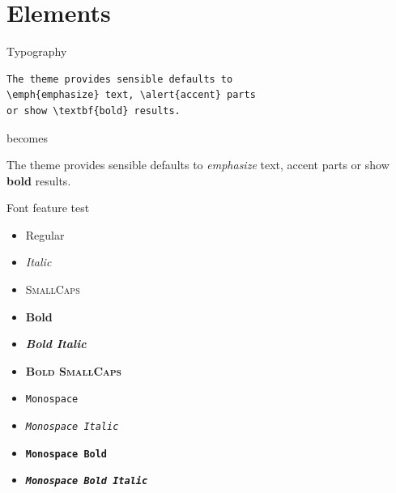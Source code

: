 \documentclass[10pt]{beamer}
\begin{document}
\section{Elements}

\begin{frame}[fragile]{Typography}
      \begin{verbatim}The theme provides sensible defaults to
\emph{emphasize} text, \alert{accent} parts
or show \textbf{bold} results.\end{verbatim}

  \begin{center}becomes\end{center}

  The theme provides sensible defaults to \emph{emphasize} text,
  \alert{accent} parts or show \textbf{bold} results.
\end{frame}

\begin{frame}{Font feature test}
  \begin{itemize}
    \item Regular
    \item \textit{Italic}
    \item \textsc{SmallCaps}
    \item \textbf{Bold}
    \item \textbf{\textit{Bold Italic}}
    \item \textbf{\textsc{Bold SmallCaps}}
    \item \texttt{Monospace}
    \item \texttt{\textit{Monospace Italic}}
    \item \texttt{\textbf{Monospace Bold}}
    \item \texttt{\textbf{\textit{Monospace Bold Italic}}}
  \end{itemize}
\end{frame}
\end{document}
